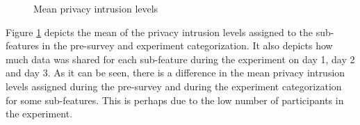 
\begin{figure}[htp]
\hspace{1em}
\newline
\centering
{}
\caption{Mean privacy intrusion levels}
\label{fig:sum_mean}
\end{figure}

Figure \ref{fig:sum_mean} depicts the mean of the privacy intrusion levels assigned to the sub-features in the pre-survey and experiment categorization. It also depicts how much data was shared for each sub-feature during the experiment on day 1, day 2 and day 3. As it can be seen, there is a difference in the mean privacy intrusion levels assigned during the pre-survey and during the experiment categorization for some sub-features. This is perhaps due to the low number of participants in the experiment.

